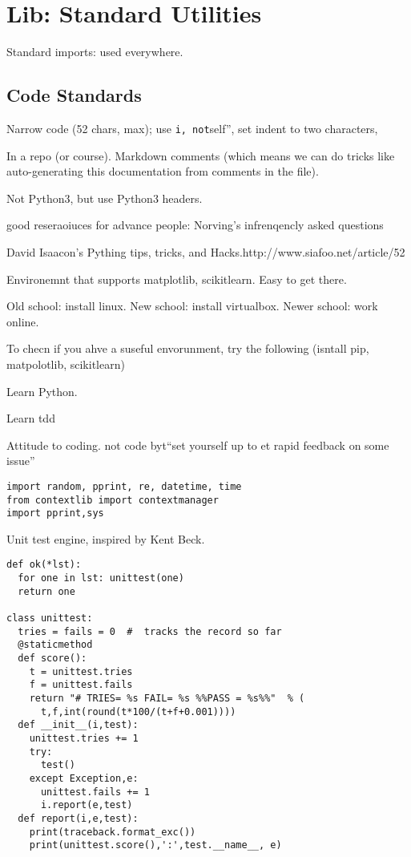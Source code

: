 \section{Lib: Standard Utilities}\label{lib-standard-utilities}

Standard imports: used everywhere.

\subsection{Code Standards}\label{code-standards}

Narrow code (52 chars, max); use
\texttt{i\textquotesingle{}\textquotesingle{},\ not}self'', set indent
to two characters,

In a repo (or course). Markdown comments (which means we can do tricks
like auto-generating this documentation from comments in the file).

Not Python3, but use Python3 headers.

good reseraoiuces for advance people: Norving's infrenqencly asked
questions

David Isaacon's Pything tips, tricks, and
Hacks.http://www.siafoo.net/article/52

Environemnt that supports matplotlib, scikitlearn. Easy to get there.

Old school: install linux. New school: install virtualbox. Newer school:
work online.

To checn if you ahve a suseful envorunment, try the following (isntall
pip, matpolotlib, scikitlearn)

Learn Python.

Learn tdd

Attitude to coding. not code byt``set yourself up to et rapid feedback
on some issue''

\begin{lstlisting}
import random, pprint, re, datetime, time
from contextlib import contextmanager
import pprint,sys
\end{lstlisting}

Unit test engine, inspired by Kent Beck.

\begin{lstlisting}
def ok(*lst):
  for one in lst: unittest(one)
  return one

class unittest:
  tries = fails = 0  #  tracks the record so far
  @staticmethod
  def score():
    t = unittest.tries
    f = unittest.fails
    return "# TRIES= %s FAIL= %s %%PASS = %s%%"  % (
      t,f,int(round(t*100/(t+f+0.001))))
  def __init__(i,test):
    unittest.tries += 1
    try:
      test()
    except Exception,e:
      unittest.fails += 1
      i.report(e,test)
  def report(i,e,test):
    print(traceback.format_exc())
    print(unittest.score(),':',test.__name__, e)
\end{lstlisting}

